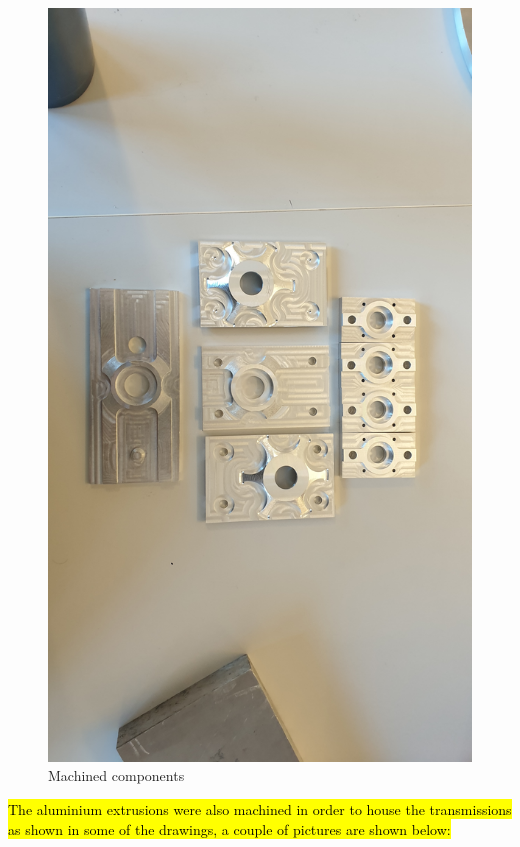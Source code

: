 \begin{figure}[H]
	\centering
	\includegraphics[width=\textwidth]{4-experiment-design/img/mechanical/mach-flanges.jpg}
	\caption{Machined components}
	\label{fig::mechanical::machined_flanges}
\end{figure}

\hl{The aluminium extrusions were also machined in order to house the transmissions as shown in some of the drawings, a couple of pictures are shown below:}

